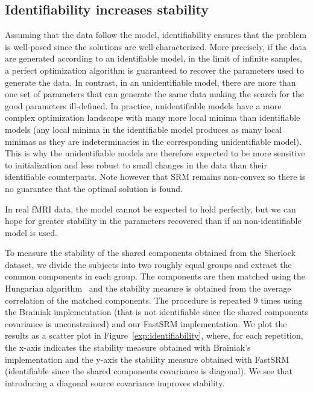 \documentclass{article}
\newcommand{\bt}[1]{\todo[color=orange, inline=True]{BT: #1}}
\begin{document}
\subsection{Identifiability increases stability}
Assuming that the data follow the model, identifiability ensures that the
problem is well-posed since the solutions are well-characterized. More precisely, if the data are generated according to an identifiable model, in the limit of infinite samples, a perfect optimization algorithm is guaranteed to recover the parameters used to generate the data. In contrast, in an unidentifiable model, there are more than one set of parameters that can generate the same data making the search for the good parameters ill-defined. In practice, unidentifiable models have a more complex optimization landscape with many more local minima than identifiable models (any local minima in the identifiable model produces as many local minimas as they are indeterminacies in the corresponding unidentifiable model). This is why the unidentifiable models are therefore expected to be more sensitive to initialization and less robust to small changes in the data than their identifiable counterparts. Note however that SRM
remains non-convex so there is no guarantee that the optimal solution is found.

%
%
In real fMRI data, the model cannot be expected to hold perfectly, but we can
hope for greater stability in the parameters recovered than if an non-identifiable
model is used.


To measure the stability of the shared components obtained from the Sherlock
dataset, we divide the subjects into two roughly equal groups and extract the
common components in each group.
%
The components are then matched using the Hungarian algorithm~\cite{kuhn1955hungarian} and the stability
measure is obtained from the average correlation of the matched components.
%
The procedure is repeated 9 times using the Brainiak implementation (that is not
identifiable since the shared components covariance is unconstrained) and our
FastSRM implementation.
%
We plot the results as a scatter plot in
Figure~\ref{exp:identifiability}, where, for each repetition, the
x-axis indicates the stability measure obtained with Brainiak's
implementation and the y-axis the stability measure obtained with
FastSRM (identifiable since the shared components covariance is
diagonal).
%
We see that introducing a diagonal source covariance improves stability.
%
\end{document}
